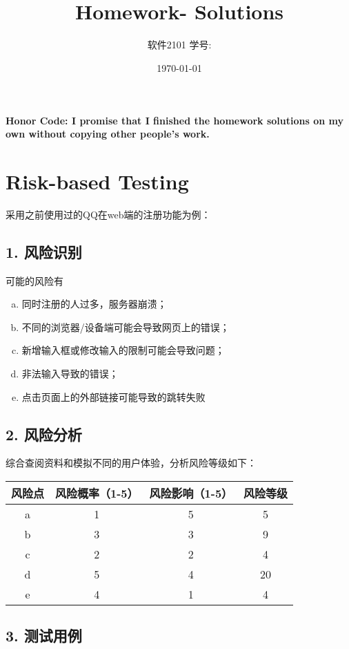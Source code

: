\documentclass[11pt, oneside]{article}  %
\title{\vspace{-4cm}\CourseCodeName \space
        \Session \protect\\  Homework-\textbf{\Homework} Solutions}
\author{软件2101 \Name \space 学号: \SID}
\date{\today}
\begin{document}
\maketitle

\textbf{Honor Code: I promise that I finished the homework solutions on my own without copying other people's work.}

\section*{Risk-based Testing}

采用之前使用过的QQ在web端的注册功能为例：
\subsection*{1. 风险识别}
可能的风险有
\begin{enumerate}[a.]
    \item 同时注册的人过多，服务器崩溃；
    \item 不同的浏览器/设备端可能会导致网页上的错误；
    \item 新增输入框或修改输入的限制可能会导致问题；
    \item 非法输入导致的错误；
    \item 点击页面上的外部链接可能导致的跳转失败
\end{enumerate}

\subsection*{2. 风险分析}
综合查阅资料和模拟不同的用户体验，分析风险等级如下：
\begin{table}[H]
    \centering
    \begin{tabular}{|c|c|c|c|}
        \hline
        风险点 & 风险概率（1-5） & 风险影响（1-5） & 风险等级 \\ \hline
        a   & 1         & 5         & 5    \\ \hline
        b   & 3         & 3         & 9    \\ \hline
        c   & 2         & 2         & 4    \\ \hline
        d   & 5         & 4         & 20   \\ \hline
        e   & 4         & 1         & 4    \\ \hline
    \end{tabular}
\end{table}

\subsection*{3. 测试用例}
\end{document}
